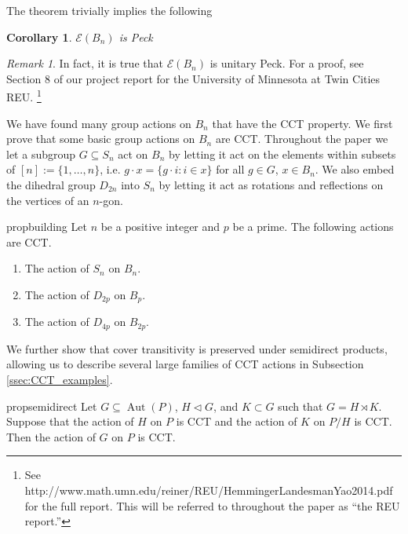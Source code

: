 \documentclass[smallextended, envcountsame, numbook]{svjour3}
\theoremstyle{plain}
\newtheorem{cor}[thm]{Corollary}
\theoremstyle{definition}
\theoremstyle{remark}
\newtheorem{rmk}[thm]{Remark}
\numberwithin{equation}{section}
\newcommand\Aut{\operatorname{Aut}}
\begin{document}
The theorem trivially implies the following
\begin{cor}
	$\mathcal E(B_n)$ is Peck
\end{cor}

\begin{rmk}
	 In fact, it is true that $\mathcal E(B_n)$ is unitary Peck. For a proof, see Section 8 of our project report for the University of Minnesota at Twin Cities REU. \footnote{See http://www.math.umn.edu/reiner/REU/HemmingerLandesmanYao2014.pdf for the full report. This will be referred to throughout the paper as ``the REU report.''} \end{rmk}



We have found many group actions on $B_n$ that have the CCT property.  We first prove that some basic group actions on $B_n$ are CCT.  Throughout the paper we let a subgroup $G\subseteq S_n$ act on $B_n$ by letting it act on the elements within subsets of $[n]:= \{1,\ldots, n\}$, i.e. $g\cdot x = \{g\cdot i\colon i\in x\}$  for all $g\in G$, $x\in B_n$.  We also embed the dihedral group $D_{2n}$ into $S_n$ by letting it act as rotations and reflections on the vertices of an $n$-gon.

\begin{restatable}{prop}{building}
\label{prop:cover_transitive_building_blocks}
 Let $n$ be a positive integer and $p$ be a prime.  The following actions are CCT.
\begin{enumerate}
\item The action of $S_n$ on $B_n$.
\item The action of $D_{2p}$ on $B_p$.
\item The action of $D_{4p}$ on $B_{2p}$.
\end{enumerate} 
\end{restatable}

We further show that cover transitivity is preserved under semidirect products, allowing us to describe several large families of CCT actions in Subsection \ref{ssec:CCT_examples}.

\begin{restatable}{prop}{semidirect}
\label{prop:semidirect_product_preservation}
Let $G\subseteq \Aut(P)$, $H\triangleleft G$, and $K\subset G$ such that $G = H\rtimes K$.  Suppose that the action of $H$ on $P$ is CCT and the action of $K$ on $P/H$ is CCT. Then the action of $G$ on $P$ is CCT.
\end{restatable}
\end{document}
